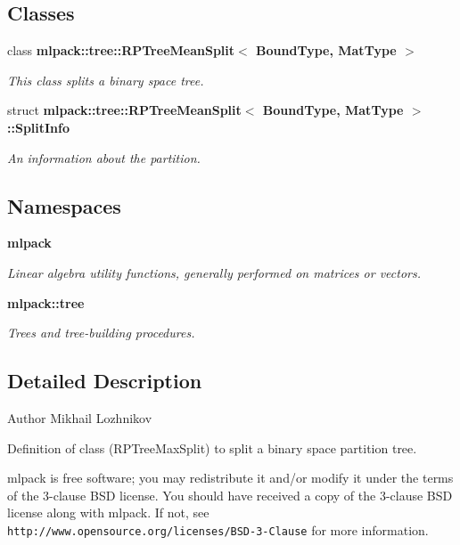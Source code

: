 \subsection*{Classes}
\begin{DoxyCompactItemize}
\item 
class {\bf mlpack\+::tree\+::\+R\+P\+Tree\+Mean\+Split$<$ Bound\+Type, Mat\+Type $>$}
\begin{DoxyCompactList}\small\item\em This class splits a binary space tree. \end{DoxyCompactList}\item 
struct {\bf mlpack\+::tree\+::\+R\+P\+Tree\+Mean\+Split$<$ Bound\+Type, Mat\+Type $>$\+::\+Split\+Info}
\begin{DoxyCompactList}\small\item\em An information about the partition. \end{DoxyCompactList}\end{DoxyCompactItemize}
\subsection*{Namespaces}
\begin{DoxyCompactItemize}
\item 
 {\bf mlpack}
\begin{DoxyCompactList}\small\item\em Linear algebra utility functions, generally performed on matrices or vectors. \end{DoxyCompactList}\item 
 {\bf mlpack\+::tree}
\begin{DoxyCompactList}\small\item\em Trees and tree-\/building procedures. \end{DoxyCompactList}\end{DoxyCompactItemize}


\subsection{Detailed Description}
\begin{DoxyAuthor}{Author}
Mikhail Lozhnikov
\end{DoxyAuthor}
Definition of class (R\+P\+Tree\+Max\+Split) to split a binary space partition tree.

mlpack is free software; you may redistribute it and/or modify it under the terms of the 3-\/clause B\+SD license. You should have received a copy of the 3-\/clause B\+SD license along with mlpack. If not, see {\tt http\+://www.\+opensource.\+org/licenses/\+B\+S\+D-\/3-\/\+Clause} for more information. 